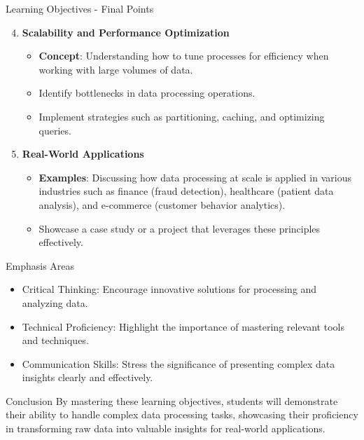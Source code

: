 \documentclass[aspectratio=169]{beamer}
\begin{document}
\begin{frame}[fragile]{Learning Objectives - Final Points}
    \begin{enumerate}
        \setcounter{enumi}{3}
        \item \textbf{Scalability and Performance Optimization}
            \begin{itemize}
                \item \textbf{Concept}: Understanding how to tune processes for efficiency when working with large volumes of data.
                \item Identify bottlenecks in data processing operations.
                \item Implement strategies such as partitioning, caching, and optimizing queries.
            \end{itemize}
        
        \item \textbf{Real-World Applications}
            \begin{itemize}
                \item \textbf{Examples}: Discussing how data processing at scale is applied in various industries such as finance (fraud detection), healthcare (patient data analysis), and e-commerce (customer behavior analytics).
                \item Showcase a case study or a project that leverages these principles effectively.
            \end{itemize}
    \end{enumerate}

    \begin{block}{Emphasis Areas}
        \begin{itemize}
            \item Critical Thinking: Encourage innovative solutions for processing and analyzing data.
            \item Technical Proficiency: Highlight the importance of mastering relevant tools and techniques.
            \item Communication Skills: Stress the significance of presenting complex data insights clearly and effectively.
        \end{itemize}
    \end{block}
    
    \begin{block}{Conclusion}
        By mastering these learning objectives, students will demonstrate their ability to handle complex data processing tasks, showcasing their proficiency in transforming raw data into valuable insights for real-world applications.
    \end{block}
\end{frame}
\end{document}
